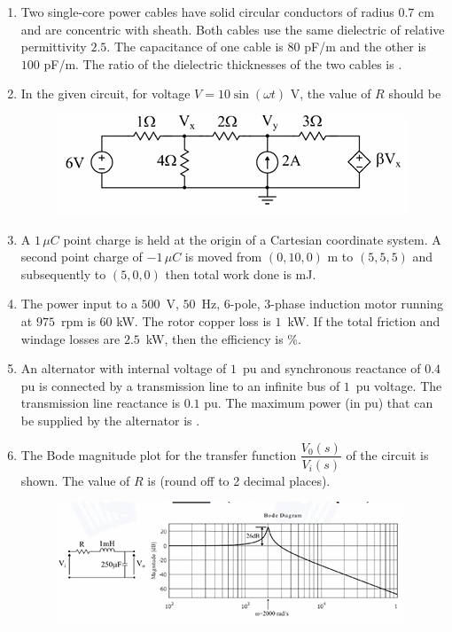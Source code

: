 \documentclass[journal,12pt,onecolumn]{IEEEtran}
\theoremstyle{remark}
\begin{document}
\begin{flushleft}
\begin{enumerate}
\item Two single-core power cables have solid circular conductors of radius $0.7$ cm and are concentric with sheath.  
Both cables use the same dielectric of relative permittivity $2.5$.  
The capacitance of one cable is $80$ pF/m and the other is $100$ pF/m.  
The ratio of the dielectric thicknesses of the two cables is \underline{\hspace{2cm}}.


\item In the given circuit, for voltage $V = 10 \sin(\omega t)$ V, the value of $R$ should be 
\begin{figure}[H]
    \centering
    \includegraphics[width=0.5\columnwidth]{figs/26.png}
    \caption{}
    \label{fig:placeholder}
\end{figure}

\item A $1 \,\mu C$ point charge is held at the origin of a Cartesian coordinate system.  
A second point charge of $-1\,\mu C$ is moved from
$(0,10,0)$ m to $(5,5,5)$ and subsequently to $(5,0,0)$ then total work done is mJ.  




\item The power input to a $500\,$ V, $50\,$ Hz, 6-pole, 3-phase induction motor running at $975\,$ rpm is $60$ kW.  
The rotor copper loss is $1\,$ kW.  
If the total friction and windage losses are $2.5\,$ kW, then the efficiency is \underline{\hspace{2cm}} \%.


\item An alternator with internal voltage of $1\,$ pu and synchronous reactance of $0.4$ pu is connected by a transmission line to an infinite bus of $1\,$ pu voltage.  
The transmission line reactance is $0.1$ pu.  
The maximum power (in pu) that can be supplied by the alternator is \underline{\hspace{2cm}}.


\item The Bode magnitude plot for the transfer function $\dfrac{V_0(s)}{V_i(s)}$ of the circuit is shown.  
The value of $R$ is \underline{\hspace{2cm}} (round off to 2 decimal places).
\begin{figure}[H]
    \centering
    \includegraphics[width=0.5\columnwidth]{30.png}
    \caption{}
    \label{fig:placeholder}
\end{figure}





\end{enumerate}
\end{flushleft}
\end{document}

